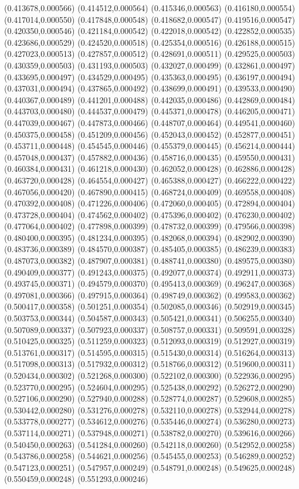 {(0.413678,0.000566) (0.414512,0.000564) (0.415346,0.000563) (0.416180,0.000554) (0.417014,0.000550) (0.417848,0.000548) (0.418682,0.000547) (0.419516,0.000547) (0.420350,0.000546) (0.421184,0.000542) (0.422018,0.000542) (0.422852,0.000535) (0.423686,0.000529) (0.424520,0.000518) (0.425354,0.000516) (0.426188,0.000515) (0.427023,0.000513) (0.427857,0.000512) (0.428691,0.000511) (0.429525,0.000503) (0.430359,0.000503) (0.431193,0.000503) (0.432027,0.000499) (0.432861,0.000497) (0.433695,0.000497) (0.434529,0.000495) (0.435363,0.000495) (0.436197,0.000494) (0.437031,0.000494) (0.437865,0.000492) (0.438699,0.000491) (0.439533,0.000490) (0.440367,0.000489) (0.441201,0.000488) (0.442035,0.000486) (0.442869,0.000484) (0.443703,0.000480) (0.444537,0.000479) (0.445371,0.000478) (0.446205,0.000471) (0.447039,0.000467) (0.447873,0.000466) (0.448707,0.000464) (0.449541,0.000460) (0.450375,0.000458) (0.451209,0.000456) (0.452043,0.000452) (0.452877,0.000451) (0.453711,0.000448) (0.454545,0.000446) (0.455379,0.000445) (0.456214,0.000444) (0.457048,0.000437) (0.457882,0.000436) (0.458716,0.000435) (0.459550,0.000431) (0.460384,0.000431) (0.461218,0.000430) (0.462052,0.000428) (0.462886,0.000428) (0.463720,0.000428) (0.464554,0.000427) (0.465388,0.000427) (0.466222,0.000422) (0.467056,0.000420) (0.467890,0.000415) (0.468724,0.000409) (0.469558,0.000408) (0.470392,0.000408) (0.471226,0.000406) (0.472060,0.000405) (0.472894,0.000404) (0.473728,0.000404) (0.474562,0.000402) (0.475396,0.000402) (0.476230,0.000402) (0.477064,0.000402) (0.477898,0.000399) (0.478732,0.000399) (0.479566,0.000398) (0.480400,0.000395) (0.481234,0.000395) (0.482068,0.000394) (0.482902,0.000390) (0.483736,0.000389) (0.484570,0.000387) (0.485405,0.000385) (0.486239,0.000383) (0.487073,0.000382) (0.487907,0.000381) (0.488741,0.000380) (0.489575,0.000380) (0.490409,0.000377) (0.491243,0.000375) (0.492077,0.000374) (0.492911,0.000373) (0.493745,0.000371) (0.494579,0.000370) (0.495413,0.000369) (0.496247,0.000368) (0.497081,0.000366) (0.497915,0.000364) (0.498749,0.000362) (0.499583,0.000362) (0.500417,0.000358) (0.501251,0.000354) (0.502085,0.000346) (0.502919,0.000345) (0.503753,0.000344) (0.504587,0.000343) (0.505421,0.000341) (0.506255,0.000340) (0.507089,0.000337) (0.507923,0.000337) (0.508757,0.000331) (0.509591,0.000328) (0.510425,0.000325) (0.511259,0.000323) (0.512093,0.000319) (0.512927,0.000319) (0.513761,0.000317) (0.514595,0.000315) (0.515430,0.000314) (0.516264,0.000313) (0.517098,0.000313) (0.517932,0.000312) (0.518766,0.000312) (0.519600,0.000311) (0.520434,0.000302) (0.521268,0.000300) (0.522102,0.000300) (0.522936,0.000295) (0.523770,0.000295) (0.524604,0.000295) (0.525438,0.000292) (0.526272,0.000290) (0.527106,0.000290) (0.527940,0.000288) (0.528774,0.000287) (0.529608,0.000285) (0.530442,0.000280) (0.531276,0.000278) (0.532110,0.000278) (0.532944,0.000278) (0.533778,0.000277) (0.534612,0.000276) (0.535446,0.000274) (0.536280,0.000273) (0.537114,0.000271) (0.537948,0.000271) (0.538782,0.000270) (0.539616,0.000266) (0.540450,0.000263) (0.541284,0.000260) (0.542118,0.000260) (0.542952,0.000258) (0.543786,0.000258) (0.544621,0.000256) (0.545455,0.000253) (0.546289,0.000252) (0.547123,0.000251) (0.547957,0.000249) (0.548791,0.000248) (0.549625,0.000248) (0.550459,0.000248) (0.551293,0.000246) }
